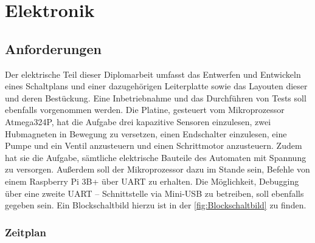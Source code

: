 \chapter{Elektronik}

\section{Anforderungen}

Der elektrische Teil dieser Diplomarbeit umfasst das Entwerfen und Entwickeln eines Schaltplans und einer dazugehörigen Leiterplatte sowie das Layouten dieser und deren Bestückung.
Eine Inbetriebnahme und das Durchführen von Tests soll ebenfalls vorgenommen werden.
Die Platine, gesteuert vom Mikroprozessor Atmega324P, hat die Aufgabe drei kapazitive Sensoren einzulesen,
zwei Hubmagneten in Bewegung zu versetzen, einen Endschalter einzulesen, eine Pumpe und ein Ventil anzusteuern und einen Schrittmotor anzusteuern.
Zudem hat sie die Aufgabe, sämtliche elektrische Bauteile des Automaten mit Spannung zu versorgen.
Außerdem soll der Mikroprozessor dazu im Stande sein, Befehle von einem Raspberry Pi 3B+ über \acs{UART} zu erhalten.
Die Möglichkeit, Debugging über eine zweite UART – Schnittstelle via Mini-\acs{USB} zu betreiben, soll ebenfalls gegeben sein.
Ein Blockschaltbild hierzu ist in der \autoref{fig:Blockschaltbild} zu finden.

\subsection{Zeitplan}

